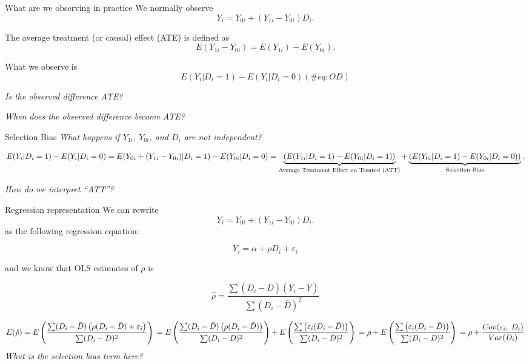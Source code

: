 \documentclass[
  ignorenonframetext,
]{beamer}
\begin{document}
\begin{frame}{What are we observing in practice}
\protect\hypertarget{what-are-we-observing-in-practice}{}
We normally observe \[
Y_i=Y_{0i}+(Y_{1i}-Y_{0i})D_{i}.
\]

The average treatment (or causal) effect (ATE) is defined as
\begin{equation}
E(Y_{1i}-Y_{0i})=E(Y_{1i})-E(Y_{0i}).
\end{equation}

What we observe is \begin{equation}
E(Y_{i}|D_i=1)-E(Y_{i}|D_i=0) (\#eq:OD)
\end{equation}

\emph{Is the observed difference ATE?}

\emph{When does the observed difference become ATE?}
\end{frame}

\begin{frame}{Selection Bias}
\protect\hypertarget{selection-bias}{}
\emph{What happens if \(Y_{1i}\), \(Y_{0i}\), and \(D_i\) are not
independent?}

\begin{equation}
E(Y_{i}|D_i=1)-E(Y_{i}|D_i=0) \\
=E(Y_{0i}+(Y_{1i}-Y_{0i})|D_i=1)-E(Y_{0i}|D_i=0) \\
=\underbrace{(E(Y_{1i}|D_i=1)-E(Y_{0i}|D_i=1))}_\text{Average Treatment Effect on Treated (ATT)}+\underbrace{(E(Y_{0i}|D_i=1)-E(Y_{0i}|D_i=0))}_\text{Selection Bias}.
\end{equation}

\emph{How do we interpret ``ATT''?}
\end{frame}

\begin{frame}{Regression representation}
\protect\hypertarget{regression-representation}{}
We can rewrite \[
Y_i=Y_{0i}+(Y_{1i}-Y_{0i})D_{i}.
\] as the following regression equation:

\[
Y_i=\alpha+\rho D_{i}+\varepsilon_i
\]

and we know that OLS estimates of \(\rho\) is

\[
\hat{\rho}=\frac{\sum (D_i - \bar{D})(Y_i-\bar{Y})}{\sum (D_i - \bar{D})^2} 
\]

\[
E(\hat{\rho})=E\left(\frac{\sum (D_i - \bar{D})\left(\rho (D_i-\bar{D})+\varepsilon_i \right)}{\sum (D_i - \bar{D})^2} \right)\\
=E\left(\frac{\sum (D_i - \bar{D})\left(\rho (D_i-\bar{D})\right)}{\sum (D_i - \bar{D})^2}\right)+E\left(\frac{\sum \left(\varepsilon_i (D_i-\bar{D})\right)}{\sum (D_i - \bar{D})^2} \right)\\
=\rho+E\left(\frac{\sum \left(\varepsilon_i (D_i-\bar{D})\right)}{\sum (D_i - \bar{D})^2} \right)\\
=\rho+\frac{Cov(\varepsilon_i,\;D_i)}{Var(D_i)}
\] \emph{What is the selection bias term here?}
\end{frame}
\end{document}
